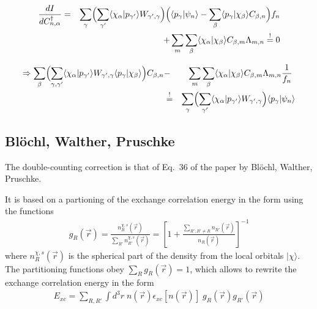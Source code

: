 \documentclass[11pt,a4paper]{report}
\begin{document}
\begin{eqnarray}
\frac{dI}{dC^\dagger_{n,\alpha}}&=&
\sum_\gamma
\Bigl(\sum_{\gamma'} \langle\chi_\alpha|p_{\gamma'}\rangle W_{\gamma',\gamma}\Bigr)
\Bigl(\langle p_{\gamma}|\psi_n\rangle-\sum_\beta \langle p_{\gamma}|\chi_\beta\rangle C_{\beta,n}\Bigr)f_n
\nonumber\\
&&+\sum_{m}
\sum_{\beta}
\langle\chi_{\alpha}|\chi_\beta\rangle C_{\beta,m}\Lambda_{m,n}\stackrel{!}{=}0
\end{eqnarray}

\begin{eqnarray}
\Rightarrow 
\sum_\beta
\Bigl(\sum_{\gamma,\gamma'}
\langle\chi_\alpha|p_{\gamma'}\rangle W_{\gamma',\gamma}
 \langle p_{\gamma}|\chi_\beta\rangle \Bigr)C_{\beta,n}
&-&\sum_{m}
\sum_{\beta}
\langle\chi_{\alpha}|\chi_\beta\rangle C_{\beta,m}\Lambda_{m,n}\frac{1}{f_n}\
\nonumber\\
&\stackrel{!}{=}&
\sum_\gamma
\Bigl(\sum_{\gamma'} \langle\chi_\alpha|p_{\gamma'}\rangle W_{\gamma',\gamma}\Bigr)
\langle p_{\gamma}|\psi_n\rangle
\end{eqnarray}





\subsection{Bl\"ochl, Walther, Pruschke}
The double-counting correction is that of Eq.~36 of the paper by
Bl\"ochl, Walther, Pruschke\cite{bloechl11_prb84_205101}.

It is based on a partioning of the exchange correlation energy in the form
using the functions 
\begin{eqnarray}
g_R(\vec{r})
=\frac{n^{\chi,s}_R(\vec{r})}{\sum_{R'}n^{\chi,s}_{R'}(\vec{r})}
=\left[1+\frac{\sum_{R';R'\neq R} n_{R'}(\vec{r})}{n_{R}(\vec{r})}\right]^{-1}
\end{eqnarray}
where $n^{\chi,s}_R(\vec{r})$ is the spherical part of the density from
the local orbitals $|\chi\rangle$.  The partitioning functions obey
$\sum_R g_R(\vec{r})=1$, which allows to rewrite the exchange
correlation energy in the form
\begin{eqnarray}
E_{xc}=\sum_{R,R'}\int d^3r\; 
n(\vec{r})\epsilon_{xc}[n(\vec{r})]\;g_R(\vec{r})g_{R'}(\vec{r})
\end{eqnarray}
\end{document}
